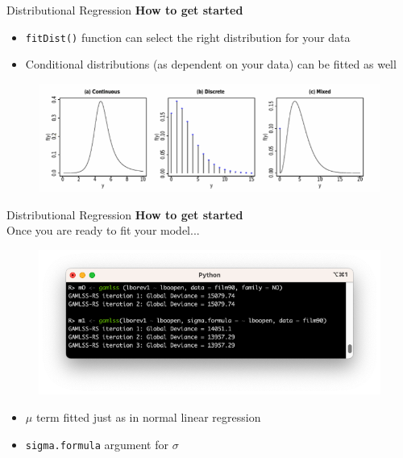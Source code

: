 \documentclass[t]{beamer} 	%
\begin{document}
\begin{frame}{Distributional Regression}
	\textbf{How to get started} \\
	\begin{itemize}
		\item \texttt{fitDist()} function can select the right distribution for your data
		\item Conditional distributions (as dependent on your data) can be fitted as well
	\end{itemize}
	\begin{figure}
		\centering
		\includegraphics[width=\textwidth]{images/gamlss_dists.png}
	\end{figure}
\end{frame}

\begin{frame}{Distributional Regression}
	\textbf{How to get started} \\
	Once you are ready to fit your model...
	\begin{figure}
		\includegraphics[width=\textwidth]{images/code_gamlss1.png}
	\end{figure}
	\begin{itemize}
		\item $\mu$ term fitted just as in normal linear regression
		\item \texttt{sigma.formula} argument for $\sigma$
	\end{itemize}
\end{frame}
\end{document}
